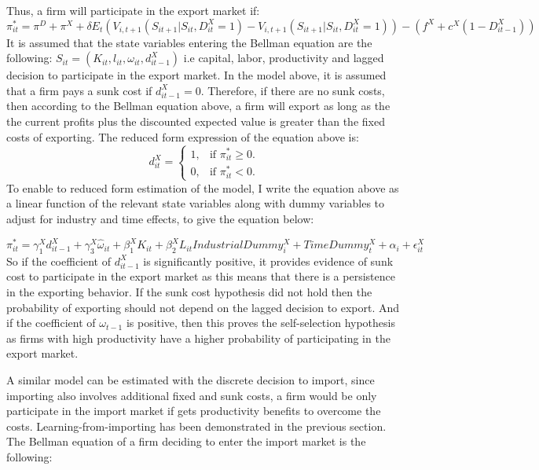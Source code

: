 \documentclass[11pt]{article}
\begin{document}
 Thus, a firm will participate in the export market if:
\begin{equation}
\pi_{it}^{*} = \pi^{D}+\pi^{X}  +
\delta E_{t}(V_{i,t+1}(S_{it+1}|S_{it},D_{it}^{X}=1) -
V_{i,t+1}(S_{it+1}|S_{it},D_{it}^{X}=1) ) -  (f^{X} + c^{X}(1-D_{it-1}^{X}))
\end{equation}
It is assumed that the state variables entering the Bellman equation
are the following: $S_{it}= (K_{it}, l_{it}, \omega_{it},
d_{it-1}^{X})$ i.e capital, labor, productivity and lagged decision to
participate in the export market. In the model above, it is assumed
that a firm pays a sunk cost if $d_{it-1}^{X} = 0$. Therefore, if there are no sunk costs, then
according to the Bellman equation above, a firm will export as long as
the the current profits plus the discounted expected value is greater
than the fixed costs of exporting. 
The reduced form expression of the equation above is: 
\begin{equation}
  d_{it}^{X}=\begin{cases}
   1 , & \text{if $\pi_{it}^{*} \geq 0$}.\\
   0 , & \text{if $\pi_{it}^{*}<  0$}.
  \end{cases}
\end{equation}
To enable to reduced form estimation of the model, I write the equation above as a linear
function of the relevant state variables along with dummy variables to
adjust for industry and time effects, to give the equation below:

\begin{equation}
  \pi_{it}^{*}=   \gamma_{1}^{X} d_{it-1}^{X} + 
\gamma_{3}^{X} \hat{\omega}_{it}  + \beta_{1}^{X}K_{it}  +\beta_{2}^{X}L_{it}
IndustrialDummy_{i}^{X} + TimeDummy_{t}^{X}  + \alpha_{i}+ \epsilon_{it}^{X}
\end{equation}
So if the coefficient of  $d_{it-1}^{X}$ is significantly positive, it provides
evidence of sunk cost to participate in the export market as this
means that there is a persistence in the exporting behavior. If the
sunk cost hypothesis did not hold then the probability of exporting
should not depend on the lagged decision to export. And if the
coefficient of $\omega_{t-1}$ is positive, then this proves the
self-selection hypothesis as firms with high
productivity have a higher probability of participating  in the export market.



A similar model can be estimated with the discrete decision to import,
since importing also involves additional fixed and sunk costs, a firm
would be only participate in the import market if gets productivity
benefits to overcome the costs. Learning-from-importing has been
demonstrated in the previous section.  The Bellman equation of a firm
deciding to enter the import market is the following: 
\end{document}
